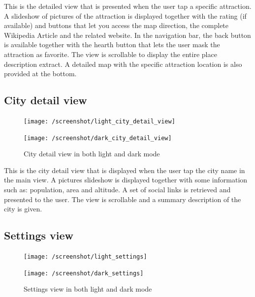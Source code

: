 \documentclass[a4paper, 11pt, parskip=half]{scrreprt}
\theoremstyle{definition}
\begin{document}
This is the detailed view that is presented when the user tap a specific attraction. A slideshow of pictures of the attraction is displayed together with the rating (if available) and buttons that let you access the map direction, the complete Wikipedia Article and the related website.
In the navigation bar, the back button is available together with the hearth button that lets the user mask the attraction as favorite. The view is scrollable to display the entire place description extract. A detailed map with the specific attraction location is also provided at the bottom. 

\subsection{City detail view}

\begin{figure}[H]
	\centering
	\begin{minipage}{.5\textwidth}
  	\centering
  	\texttt{[image: /screenshot/light\_city\_detail\_view]}
  	\label{fig:test1}
	\end{minipage}%
	\begin{minipage}{.5\textwidth}
  	\centering
  	\texttt{[image: /screenshot/dark\_city\_detail\_view]}
  	\label{fig:test2}
	\end{minipage}
	\caption{City detail view in both light and dark mode}
\end{figure}

This is the city detail view that is displayed when the user tap the city name in the main view. A pictures slideshow is displayed together with some information such as: population, area and altitude. A set of social links is retrieved and presented to the user. The view is scrollable and a summary description of the city is given.


\subsection{Settings view}

\begin{figure}[H]
	\centering
	\begin{minipage}{.5\textwidth}
  	\centering
  	\texttt{[image: /screenshot/light\_settings]}
  	\label{fig:test1}
	\end{minipage}%
	\begin{minipage}{.5\textwidth}
  	\centering
  	\texttt{[image: /screenshot/dark\_settings]}
  	\label{fig:test2}
	\end{minipage}
	\caption{Settings view in both light and dark mode}
\end{figure}
\end{document}
